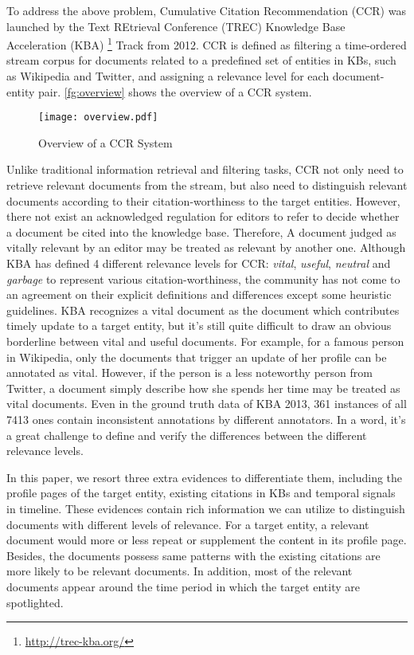 \documentclass{sig-alternate}
\begin{document}
To address the above problem, Cumulative Citation Recommendation (CCR) was launched by the Text REtrieval Conference (TREC) Knowledge Base Acceleration (KBA) \footnote{\url{http://trec-kba.org/}} Track from 2012. CCR is defined as filtering a time-ordered stream corpus for documents related to a predefined set of entities in KBs, such as Wikipedia and Twitter, and assigning a relevance level for each document-entity pair. \autoref{fg:overview} shows the overview of a CCR system.

\begin{figure}
\centering
\texttt{[image: overview.pdf]}
\caption{Overview of a CCR System}
\label{fg:overview}
\end{figure}

Unlike traditional information retrieval and filtering tasks, CCR  not only need to retrieve relevant documents from the stream, but also need to distinguish relevant documents according to their citation-worthiness to the target entities. However, there not exist an acknowledged regulation for editors to refer to decide whether a document be cited into the knowledge base. Therefore, A document judged as vitally relevant by an editor may be treated as relevant by another one. Although KBA has defined 4 different relevance levels for CCR: \textit{vital}, \textit{useful}, \textit{neutral} and \textit{garbage} to represent various citation-worthiness, the community has not come to an agreement on their explicit definitions and differences except some heuristic guidelines. KBA recognizes a vital document as the document which contributes timely update to a target entity, but it's still quite difficult to draw an obvious  borderline between vital and useful documents. For example, for a famous person in Wikipedia, only the documents that trigger an update of her profile can be annotated as vital. However, if the person is a less noteworthy person from Twitter, a document simply describe how she spends her time may be treated as vital documents.
Even in the ground truth data of KBA 2013, 361 instances of  all 7413 ones contain inconsistent annotations by different annotators. In a word, it's a great challenge to define and verify the differences between the different relevance levels.

In this paper, we resort three extra evidences to differentiate them, including the profile pages of the target entity, existing citations in KBs and temporal signals in timeline. These evidences contain rich information we can utilize to distinguish documents with different levels of relevance. For a target entity, a relevant document would more or less repeat or supplement the content in its profile page. Besides, the documents possess same patterns with the existing citations are more likely to be relevant documents. In addition, most of the relevant documents appear around the time period in which the target entity are spotlighted.
\end{document}

